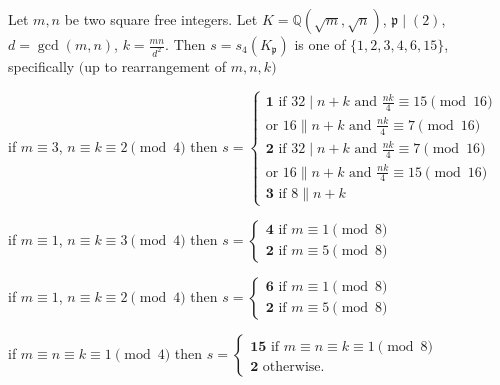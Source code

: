 \documentclass[10pt,a4paper]{amsart}
\begin{document}
\begin{thm}\label{main2} Let $m,n$ be two square free integers. Let $K = \mathbb{Q}(\sqrt{m},\sqrt{n})$, $\mathfrak{p} \mid (2)$, $d = \gcd(m,n)$, $k = \frac{mn}{d^2}$. Then $s = s_4(K_{\mathfrak{p}})$ is one of $\{1,2,3,4,6,15\}$, specifically $($up to rearrangement of $m,n,k)$
\begin{center}
    if $m \equiv 3$, $n\equiv k \equiv 2 \pmod{4}$ then $s = \begin{cases}
        \textbf{1} \text{ if } 32 \mid n+k \text{ and } \frac{nk}{4} \equiv 15 \pmod{16} \\
        \text{or } 16 \parallel n+k \text{ and } \frac{nk}{4} \equiv 7 \pmod{16}\\
        \textbf{2} \text{ if } 32 \mid n+k \text{ and } \frac{nk}{4} \equiv 7 \pmod{16} \\
        \text{or } 16 \parallel n+k \text{ and } \frac{nk}{4} \equiv 15 \pmod{16}\\
        \textbf{3} \text{ if } 8 \parallel n+k
    \end{cases}$
\end{center}
\begin{center}
    if $m \equiv 1$, $n \equiv k \equiv 3 \pmod{4}$ then $s = \begin{cases}
        \textbf{4} \text{ if } m \equiv 1 \pmod{8}\\
        \textbf{2} \text{ if } m \equiv 5 \pmod{8}
    \end{cases}$
\end{center}
\begin{center}
    if $m \equiv 1$, $n \equiv k \equiv 2 \pmod{4}$ then $s = \begin{cases}
        \textbf{6} \text{ if } m \equiv 1 \pmod{8}\\
        \textbf{2} \text{ if } m \equiv 5 \pmod{8}
    \end{cases}$
\end{center}
\begin{center}
    if $m \equiv n \equiv k \equiv 1 \pmod{4}$ then $s = \begin{cases}
        \textbf{15} \text{ if } m \equiv n \equiv k \equiv 1 \pmod{8}\\
        \textbf{2} \text{ otherwise.}
    \end{cases}$
\end{center}
\end{thm}
\end{document}
